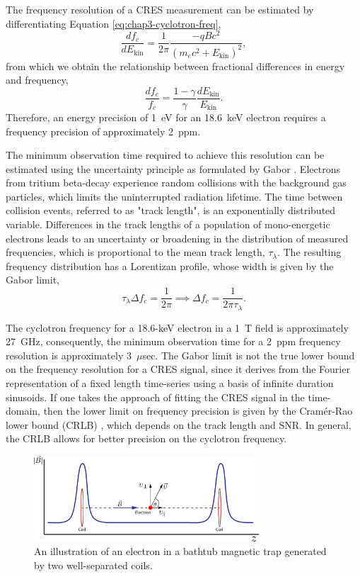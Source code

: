 The frequency resolution of a CRES measurement can be estimated by differentiating Equation \ref{eq:chap3-cyclotron-freq},
\begin{equation}
    \frac{df_c}{dE_\mathrm{kin}} = \frac{1}{2\pi}\frac{-qBc^2}{\left(m_ec^2+E_\mathrm{kin}\right)^2},
\end{equation}
from which we  obtain the relationship between fractional differences in energy and frequency,
\begin{equation}
    \frac{df_c}{f_c}=\frac{1-\gamma}{\gamma}\frac{dE_\mathrm{kin}}{E_\mathrm{kin}}.
\end{equation}
Therefore, an energy precision of 1~eV for an 18.6~keV electron requires a frequency precision of approximately 2~ppm.

The minimum observation time required to achieve this resolution can be estimated using the uncertainty principle as formulated by Gabor \cite{gabor}. Electrons from tritium beta-decay experience random collisions with the background gas particles, which limits the uninterrupted radiation lifetime. The time between collision events, referred to as "track length", is an exponentially distributed variable. Differences in the track lengths of a population of mono-energetic electrons leads to an uncertainty or broadening in the distribution of measured frequencies, which is proportional to the mean track length, $\tau_\lambda$. The resulting frequency distribution has a Lorentizan profile, whose width is given by the Gabor limit,
\begin{equation}
    \tau_\lambda\Delta f_c=\frac{1}{2\pi}\implies\Delta f_c=\frac{1}{2\pi\tau_\lambda}.
\end{equation}

The cyclotron frequency for a 18.6-keV electron in a 1~T field is approximately 27~GHz, consequently, the minimum observation time for a 2~ppm frequency resolution is approximately 3~$\mu$sec. The Gabor limit is not the true lower bound on the frequency resolution for a CRES signal, since it derives from the Fourier representation of a fixed length time-series using a basis of infinite duration sinusoids. If one takes the approach of fitting the CRES signal in the time-domain, then the lower limit on frequency precision is given by the Cram\'{e}r-Rao lower bound (CRLB) \cite{nick_viterbi}, which depends on the track length and SNR. In general, the CRLB allows for better precision on the cyclotron frequency.

\begin{figure}[htbp]
    \centering
    \includegraphics*[width=0.75\textwidth]{figs/Chapter-3/230628_bathtub_trap.png}
    \caption{\label{fig:chap3-bathtub-trap}An illustration of an electron in a bathtub magnetic trap generated by two well-separated coils.}
\end{figure}

